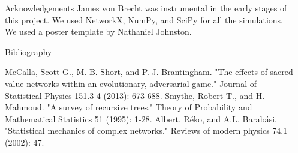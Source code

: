 \documentclass[final]{beamer}
\newlength{\sepwid}
\newlength{\onecolwid}
\begin{document}
\begin{frame}[t]
\begin{columns}[t]
\begin{column}{\onecolwid}
\begin{block}{Acknowledgements}
James von Brecht was instrumental in the early stages of this project.  We used NetworkX, NumPy, and SciPy for all the simulations.  
We used a poster template by Nathaniel Johnston.  
\end{block}
\begin{block}{Bibliography}
\small{\begin{thebibliography}{99}
 McCalla, Scott G., M. B. Short, and P. J. Brantingham. "The effects of sacred value networks within an evolutionary, adversarial game." Journal of Statistical Physics 151.3-4 (2013): 673-688.
 Smythe, Robert T., and H. Mahmoud. "A survey of recursive trees." Theory of Probability and Mathematical Statistics 51 (1995): 1-28.
Albert, R\'{e}ko, and A.L. Barab\'{a}si. "Statistical mechanics of complex networks." Reviews of modern physics 74.1 (2002): 47.
\end{thebibliography}}
\end{block}

\end{column}

\begin{column}{\sepwid}\end{column}			%
\end{columns}
\end{frame}
\end{document}
